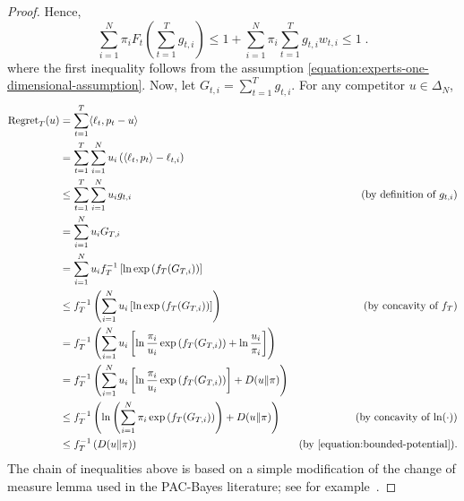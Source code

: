\begin{proof}
Hence,
\begin{equation}
\label{equation:bounded-potential}
\sum_{i=1}^N  \pi_i F_t \left(\sum_{t=1}^T g_{t,i} \right) \le 1 + \sum_{i=1}^N \pi_i \sum_{t=1}^T  g_{t,i} w_{t,i} \le 1 \; .
\end{equation}
where the first inequality follows from the assumption
\eqref{equation:experts-one-dimensional-assumption}. Now, let $G_{t,i} =
\sum_{t=1}^T g_{t,i}$. For any competitor $u \in \Delta_N$,
\begingroup
\allowdisplaybreaks
\begin{align*}
\allowdisplaybreaks
\Regret_T(u)
& = \sum_{t=1}^T \langle \ell_t, p_t - u \rangle \\
& = \sum_{t=1}^T \sum_{i=1}^N u_i \left( \langle \ell_t, p_t \rangle - \ell_{t,i} \right) \\
& \le \sum_{t=1}^T \sum_{i=1}^N u_i g_{t,i} & \text{(by definition of $g_{t,i}$)} \\
& = \sum_{i=1}^N u_i G_{T,i} \\
& = \sum_{i=1}^N u_i f_T^{-1}\left[\ln \exp\left(f_T(G_{T,i})\right)\right] \\
& \le f_T^{-1}\left(\sum_{i=1}^N u_i \left[\ln \exp\left(f_T(G_{T,i})\right)\right]\right) & \text{(by concavity of $f_T$)} \\
& = f_T^{-1}\left(\sum_{i=1}^N u_i \left[\ln \frac{\pi_i}{u_i}\exp\left(f_T(G_{T,i})\right)+ \ln\frac{u_i}{\pi_i}\right]\right) \\
& = f_T^{-1}\left(\sum_{i=1}^N u_i \left[\ln \frac{\pi_i}{u_i}\exp\left(f_T(G_{T,i})\right)\right] + \KL{u}{\pi}\right) \\
& \le f_T^{-1}\left(\ln \left(\sum_{i=1}^N \pi_i \exp\left(f_T(G_{T,i})\right) \right) + \KL{u}{\pi}\right) & \text{(by concavity of $\ln(\cdot)$)} \\
& \le f_T^{-1}\left(\KL{u}{\pi}\right) & \text{(by \eqref{equation:bounded-potential})}.
\end{align*}
\endgroup
The chain of inequalities above is based on a simple modification of the change
of measure lemma used in the PAC-Bayes literature; see for
example~\citet{McAllester13}.
\end{proof}

